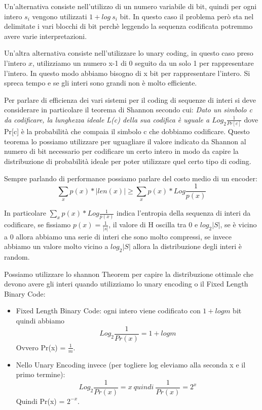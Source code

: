 \documentclass[14pt]{extreport}
\begin{document}
Un'alternativa consiste nell'utilizzo di un numero variabile di bit, quindi per ogni intero $s_i$ vengono utilizzati $1+log\ s_i$ bit. In questo caso il problema però sta nel delimitate i vari blocchi di bit perchè leggendo la sequenza codificata potremmo avere varie interpretazioni.

Un'altra alternativa consiste nell'utilizzare lo unary coding, in questo caso preso l'intero $x$, utilizziamo un numero x-1 di 0 seguito da un solo 1 per rappresentare l'intero. In questo modo abbiamo bisogno di x bit per rappresentare l'intero. Si spreca tempo e se gli interi sono grandi non è molto efficiente.

Per parlare di efficienza dei vari sistemi per il coding di sequenze di interi si deve considerare in particolare il teorema di Shannon secondo cui: \newline
\textit{Dato un simbolo c da codificare, la lunghezza ideale L(c) della sua codifica è uguale a $Log_2\frac{1}{Pr[c]}$} dove Pr[c] è la probabilità che compaia il simbolo c che dobbiamo codificare.
Questo teorema lo possiamo utilizzare per uguagliare il valore indicato da Shannon al numero di bit necessario per codificare un certo intero in modo da capire la distribuzione di probabilità ideale per poter utilizzare quel certo tipo di coding.

Sempre parlando di performance possiamo parlare del costo medio di un encoder:
\begin{equation}
\sum_x p(x)*|len(x)| \geq \sum_x p(x)*Log \frac{1}{p(x)}
\end{equation}

In particolare $\sum_x p(x)*Log \frac{1}{p(x)}$ indica l'entropia della sequenza di interi da codificare, se fissiamo $p(x)=\frac{1}{|s|}$, il valore di H oscilla tra 0 e $log_2|S|$, se è vicino a 0 allora abbiamo una serie di interi che sono molto compressi, se invece abbiamo un valore molto vicino a $log_2|S|$ allora la distribuzione degli interi è random.


Possiamo utilizzare lo shannon Theorem per capire la distribuzione ottimale che devono avere gli interi quando utilizziamo lo unary encoding o il Fixed Length Binary Code:

\begin{itemize}
\item Fixed Length Binary Code: ogni intero viene codificato con $1+logm$ bit quindi abbiamo 
\begin{equation}
Log_2\frac{1}{Pr(x)} = 1+log m 
\end{equation}
Ovvero Pr(x) = $\frac{1}{m}$.
\item Nello Unary Encoding invece (per togliere log eleviamo alla seconda x e il primo termine):
\begin{equation}
Log_2\frac{1}{Pr(x)} = x\ quindi \ \frac{1}{Pr(x)} = 2^x
\end{equation}
Quindi Pr(x) = $2^{-x}$.
\end{itemize}
\end{document}
